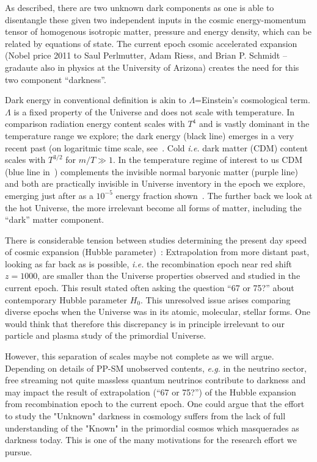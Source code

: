As described, there are two unknown dark components as one is able to disentangle these given two independent inputs in the cosmic energy-momentum tensor of homogenous isotropic matter, pressure and energy density, which can be related by equations of state. The current epoch csomic accelerated expansion (Nobel price 2011 to Saul Perlmutter, Adam Riess, and Brian P. Schmidt -- gradaute also in physics at the University of Arizona) creates the need for this two component ``darkness''.

Dark energy in conventional definition is akin to $\Lambda$=Einstein's cosmological term. $\Lambda$ is a fixed property of the Universe and does not scale with temperature. In comparison radiation energy content scales with $T^4$ and is vastly dominant in the temperature range we explore; the dark energy (black line) emerges in a very recent past (on logaritmic time scale, see~. Cold {\it i.e.\/} dark matter (CDM) content scales with $T^{3/2}$ for $m/T\gg 1$. In the temperature regime of interest to us CDM (blue line in~) complements the invisible normal baryonic matter (purple line) and both are practically invisible in Universe inventory in the epoch we explore, emerging just after as a $10^{-5}$ energy fraction shown~. The further back we look at the hot Universe, the more irrelevant become all forms of matter, including the ``dark'' matter component. 

There is considerable tension between studies determining the present day speed of cosmic expansion (Hubble parameter)~\cite{DiValentino:2024spr,DiValentino:2021izs}: Extrapolation from more distant past, looking as far back as is possible, {\it i.e.\/} the recombination epoch near red shift $z=1000$, are smaller than the Universe properties observed and studied in the current epoch. This result stated often asking the question ``67 or 75?'' about contemporary Hubble parameter $H_0$. This unresolved issue arises comparing diverse epochs when the Universe was in its atomic, molecular, stellar forms. One would think that therefore this discrepancy is in principle irrelevant to our particle and plasma study of the primordial Universe. 

However, this separation of scales maybe not complete as we will argue. Depending on details of PP-SM unobserved contents, {\it e.g.\/} in the neutrino sector, free streaming not quite massless quantum neutrinos contribute to darkness and may impact the result of extrapolation (``67 or 75?'') of the Hubble expansion from recombination epoch to the current epoch. One could argue that the effort to study the "Unknown" darkness in cosmology suffers from the lack of full understanding of the "Known" in the primordial cosmos which masquerades as darkness today. This is one of the many motivations for the research effort we pursue. 

